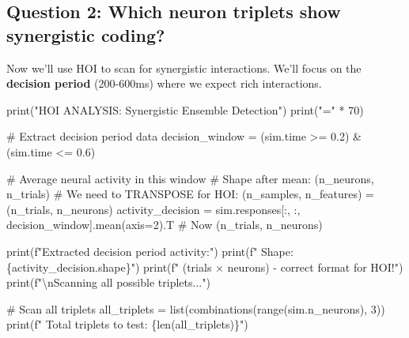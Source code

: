 \documentclass[
  11pt,
  letterpaper,
  oneside,
  openany]{book}
\newenvironment{Shaded}{\begin{snugshade}}{\end{snugshade}}
\newcommand{\BuiltInTok}[1]{\textcolor[rgb]{0.00,0.23,0.31}{#1}}
\newcommand{\CharTok}[1]{\textcolor[rgb]{0.13,0.47,0.30}{#1}}
\newcommand{\CommentTok}[1]{\textcolor[rgb]{0.37,0.37,0.37}{#1}}
\newcommand{\DecValTok}[1]{\textcolor[rgb]{0.68,0.00,0.00}{#1}}
\newcommand{\FloatTok}[1]{\textcolor[rgb]{0.68,0.00,0.00}{#1}}
\newcommand{\NormalTok}[1]{\textcolor[rgb]{0.00,0.23,0.31}{#1}}
\newcommand{\OperatorTok}[1]{\textcolor[rgb]{0.37,0.37,0.37}{#1}}
\newcommand{\SpecialCharTok}[1]{\textcolor[rgb]{0.37,0.37,0.37}{#1}}
\newcommand{\SpecialStringTok}[1]{\textcolor[rgb]{0.13,0.47,0.30}{#1}}
\newcommand{\StringTok}[1]{\textcolor[rgb]{0.13,0.47,0.30}{#1}}
\begin{document}
\subsection{Question 2: Which neuron triplets show synergistic
coding?}\label{question-2-which-neuron-triplets-show-synergistic-coding}

Now we'll use HOI to scan for synergistic interactions. We'll focus on
the \textbf{decision period} (200-600ms) where we expect rich
interactions.

\begin{Shaded}
\begin{Highlighting}[]
\BuiltInTok{print}\NormalTok{(}\StringTok{"HOI ANALYSIS: Synergistic Ensemble Detection"}\NormalTok{)}
\BuiltInTok{print}\NormalTok{(}\StringTok{"="} \OperatorTok{*} \DecValTok{70}\NormalTok{)}

\CommentTok{\# Extract decision period data}
\NormalTok{decision\_window }\OperatorTok{=}\NormalTok{ (sim.time }\OperatorTok{\textgreater{}=} \FloatTok{0.2}\NormalTok{) }\OperatorTok{\&}\NormalTok{ (sim.time }\OperatorTok{\textless{}=} \FloatTok{0.6}\NormalTok{)}

\CommentTok{\# Average neural activity in this window}
\CommentTok{\# Shape after mean: (n\_neurons, n\_trials)}
\CommentTok{\# We need to TRANSPOSE for HOI: (n\_samples, n\_features) = (n\_trials, n\_neurons)}
\NormalTok{activity\_decision }\OperatorTok{=}\NormalTok{ sim.responses[:, :, decision\_window].mean(axis}\OperatorTok{=}\DecValTok{2}\NormalTok{).T  }\CommentTok{\# Now (n\_trials, n\_neurons)}

\BuiltInTok{print}\NormalTok{(}\SpecialStringTok{f"Extracted decision period activity:"}\NormalTok{)}
\BuiltInTok{print}\NormalTok{(}\SpecialStringTok{f"  Shape: }\SpecialCharTok{\{}\NormalTok{activity\_decision}\SpecialCharTok{.}\NormalTok{shape}\SpecialCharTok{\}}\SpecialStringTok{"}\NormalTok{)}
\BuiltInTok{print}\NormalTok{(}\SpecialStringTok{f"  (trials × neurons) {-} correct format for HOI!"}\NormalTok{)}
\BuiltInTok{print}\NormalTok{(}\SpecialStringTok{f"}\CharTok{\textbackslash{}n}\SpecialStringTok{Scanning all possible triplets..."}\NormalTok{)}

\CommentTok{\# Scan all triplets}
\NormalTok{all\_triplets }\OperatorTok{=} \BuiltInTok{list}\NormalTok{(combinations(}\BuiltInTok{range}\NormalTok{(sim.n\_neurons), }\DecValTok{3}\NormalTok{))}
\BuiltInTok{print}\NormalTok{(}\SpecialStringTok{f"  Total triplets to test: }\SpecialCharTok{\{}\BuiltInTok{len}\NormalTok{(all\_triplets)}\SpecialCharTok{\}}\SpecialStringTok{"}\NormalTok{)}


\end{Highlighting}
\end{Shaded}
\end{document}
